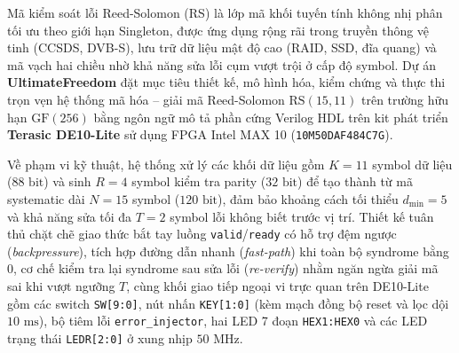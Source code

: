 \documentclass[12pt,a4paper]{report}
\begin{document}
Mã kiểm soát lỗi Reed-Solomon (RS) là lớp mã khối tuyến tính không nhị phân tối ưu theo giới hạn Singleton, được ứng dụng rộng rãi trong truyền thông vệ tinh (CCSDS, DVB-S), lưu trữ dữ liệu mật độ cao (RAID, SSD, đĩa quang) và mã vạch hai chiều nhờ khả năng sửa lỗi cụm vượt trội ở cấp độ symbol. Dự án \textbf{UltimateFreedom} đặt mục tiêu thiết kế, mô hình hóa, kiểm chứng và thực thi trọn vẹn hệ thống mã hóa -- giải mã Reed-Solomon $\text{RS}(15, 11)$ trên trường hữu hạn $\text{GF}(256)$ bằng ngôn ngữ mô tả phần cứng Verilog HDL trên kit phát triển \textbf{Terasic DE10-Lite} sử dụng FPGA Intel MAX 10 (\texttt{10M50DAF484C7G}).

Về phạm vi kỹ thuật, hệ thống xử lý các khối dữ liệu gồm $K = 11$ symbol dữ liệu ($88\text{ bit}$) và sinh $R = 4$ symbol kiểm tra parity ($32\text{ bit}$) để tạo thành từ mã systematic dài $N = 15$ symbol ($120\text{ bit}$), đảm bảo khoảng cách tối thiểu $d_{\min} = 5$ và khả năng sửa tối đa $T = 2$ symbol lỗi không biết trước vị trí. Thiết kế tuân thủ chặt chẽ giao thức bắt tay luồng \texttt{valid}/\texttt{ready} có hỗ trợ đệm ngược (\textit{backpressure}), tích hợp đường dẫn nhanh (\textit{fast-path}) khi toàn bộ syndrome bằng 0, cơ chế kiểm tra lại syndrome sau sửa lỗi (\textit{re-verify}) nhằm ngăn ngừa giải mã sai khi vượt ngưỡng $T$, cùng khối giao tiếp ngoại vi trực quan trên DE10-Lite gồm các switch \texttt{SW[9:0]}, nút nhấn \texttt{KEY[1:0]} (kèm mạch đồng bộ reset và lọc dội $10\text{ ms}$), bộ tiêm lỗi \texttt{error\_injector}, hai LED 7 đoạn \texttt{HEX1:HEX0} và các LED trạng thái \texttt{LEDR[2:0]} ở xung nhịp $50\text{ MHz}$.
\end{document}
